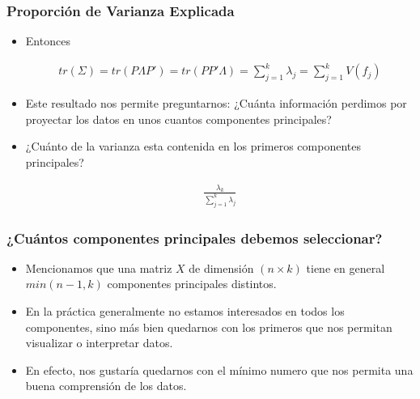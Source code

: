 \documentclass[
  shownotes,
  xcolor={svgnames},
  hyperref={colorlinks,citecolor=DarkBlue,linkcolor=DarkRed,urlcolor=DarkBlue}
  , aspectratio=169]{beamer}
\begin{document}
\begin{frame}
\frametitle{Proporción de Varianza Explicada}

\begin{itemize}


\item Entonces

\begin{align}
tr(\Sigma) = tr(P \Lambda P')= tr(PP' \Lambda ) = \sum_{j=1}^k \lambda_j= \sum_{j=1}^k V(f_j)
\end{align}

\item Este resultado nos permite preguntarnos: ¿Cuánta información perdimos por proyectar los datos en unos cuantos componentes principales? 
\medskip
\item ¿Cuánto de la varianza esta contenida en los primeros componentes
principales? 


\begin{align}
\frac{\lambda_k}{\sum_{j=1}^k \lambda_j}
\end{align}
\end{itemize}

\end{frame}
\begin{frame}
\frametitle{¿Cuántos componentes principales debemos seleccionar?}

\begin{itemize}
\item Mencionamos que una matriz $X$ de dimensión $(n \times k)$ tiene en general $min(n-1,k)$ componentes principales distintos.
\medskip
 \item En la práctica generalmente no estamos interesados en todos los componentes, sino más bien quedarnos con los primeros que nos permitan visualizar o interpretar datos. 
\medskip
\item En efecto, nos gustaría quedarnos con el mínimo numero que nos permita una buena comprensión de los datos. 
\medskip
\end{itemize}

\end{frame}
\end{document}
